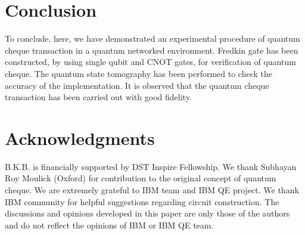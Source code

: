 \documentclass[aps,pra,twocolumn,groupedaddress,showpacs,showkeys]{revtex4-1}
\begin{document}
\section{Conclusion \label{VI}}
To conclude, here, we have demonstrated an experimental procedure of quantum cheque transaction in a quantum networked environment. Fredkin gate has been constructed, by using single qubit and CNOT gates, for verification of quantum cheque. The quantum state tomography has been performed to check the accuracy of the implementation. It is observed that the quantum cheque transaction has been carried out with good fidelity.         

\section*{Acknowledgments}
\label{acknowledgments}
B.K.B. is financially supported by DST Inspire Fellowship. We thank Subhayan Roy Moulick (Oxford) for contribution to the original concept of quantum cheque. We are extremely grateful to IBM team and IBM QE project. We thank IBM community for helpful suggestions regarding circuit construction. The discussions and opinions developed in this paper are only those of the authors and do not reflect the opinions of IBM or IBM QE team. 
\end{document}
